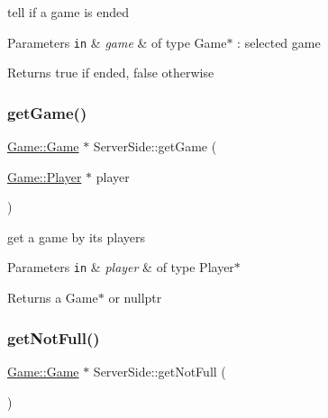 tell if a game is ended 


\begin{DoxyParams}[1]{Parameters}
\mbox{\tt in}  & {\em game} & of type Game$\ast$ \+: selected game\\
\hline
\end{DoxyParams}
\begin{DoxyReturn}{Returns}
true if ended, false otherwise 
\end{DoxyReturn}
\mbox{\label{class_server_side_a69f08b4f34448c386d9d204ba8e9ca51}} 
\subsubsection{\texorpdfstring{get\+Game()}{getGame()}}
{\footnotesize\ttfamily \hyperlink{class_game_1_1_game}{Game\+::\+Game} $\ast$ Server\+Side\+::get\+Game (\begin{DoxyParamCaption}\item[{\hyperlink{class_game_1_1_player}{Game\+::\+Player} $\ast$}]{player }\end{DoxyParamCaption})}



get a game by its players 


\begin{DoxyParams}[1]{Parameters}
\mbox{\tt in}  & {\em player} & of type Player$\ast$\\
\hline
\end{DoxyParams}
\begin{DoxyReturn}{Returns}
a Game$\ast$ or nullptr 
\end{DoxyReturn}
\mbox{\label{class_server_side_a014324eeffcf272ed539027e4c2df34b}} 
\subsubsection{\texorpdfstring{get\+Not\+Full()}{getNotFull()}}
{\footnotesize\ttfamily \hyperlink{class_game_1_1_game}{Game\+::\+Game} $\ast$ Server\+Side\+::get\+Not\+Full (\begin{DoxyParamCaption}{ }\end{DoxyParamCaption})}



